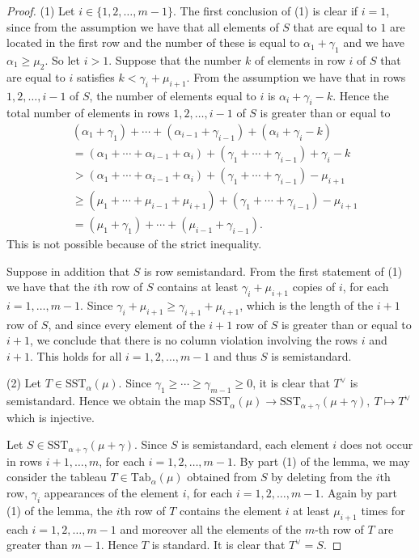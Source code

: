 \documentclass[ALCO,Unicode]{cedram}
\newcommand{\al}{\alpha}
\numberwithin{equation}{section}
\begin{document}
		\begin{proof}(1) Let $i \in \{1,2,\dots,m-1\}$. The first conclusion of (1) is clear if $i=1$, since from the assumption we have that all elements of $S$ that are equal to $1$ are located in the first row and the number of these is equal to $\al_1+\gamma_1 $ and we have  $\al_1 \ge \mu_2$. So let $i>1$. Suppose that the number $k$ of elements in row $i$ of  $S$ that are equal to $i$ satisfies $k<\gamma_i +\mu_{i+1}$. From the assumption we have that in rows $1,2,\dots,i-1$ of $S$, the number of elements equal to $i$ is $\al_i+\gamma_i-k$. Hence the total number of elements in rows $1,2,\dots, i-1$ of $S$ is greater than or equal to \begin{align*}
				&(\al_1 +\gamma_1) + \cdots + (\al_{i-1}+\gamma_{i-1})+(\al_i+\gamma_i-k) \\&=(\al_1+\cdots+\al_{i-1}+\al_i) +(\gamma_1+\cdots+\gamma_{i-1})+\gamma_i-k \\ &>(\al_1+\cdots+\al_{i-1}+\al_i) +(\gamma_1+\cdots+\gamma_{i-1})-\mu_{i+1} \\ &\ge (\mu_1+\cdots+\mu_{i-1}+\mu_{i+1})+(\gamma_1+\cdots+\gamma_{i-1})-\mu_{i+1}\\&=(\mu_1+\gamma_1)+\cdots+(\mu_{i-1}+\gamma_{i-1}).\end{align*} This is not possible because of the strict inequality.
			
			Suppose in addition that $S$ is row semistandard. From the first statement of (1) we have that the $i$th row of $S$ contains at least $\gamma_i + \mu_{i+1}$ copies of $i$, for each $i=1,\dots,m-1$. Since $\gamma_i + \mu_{i+1} \ge \gamma_{i+1}+\mu_{i+1}$, which is the length of the $i+1$ row of $S$, and since every element of the $i+1$ row of $S$ is greater than or equal to $i+1$, we conclude that there is no column violation involving the rows $i$ and $i+1$. This holds for all $i=1,2,\dots,m-1$ and thus $S$ is semistandard.
			
			(2) Let $T \in \mathrm{SST}_{\al}(\mu)$. Since $\gamma_1 \ge \cdots \ge \gamma_{m-1} \ge 0$, it is clear that $T^{\vee}$ is semistandard. Hence we obtain the map $\mathrm{SST}_{\al}(\mu) \to \mathrm{SST}_{\al+\gamma}(\mu+\gamma), \ T \mapsto T^{\vee}$ which is injective.
			
			Let  $S \in \mathrm{SST}_{\al+\gamma}(\mu+\gamma)$. Since $S$ is semistandard, each element $i$ does not occur in rows $i+1,\dots,m$, for each $i=1,2,\dots,m-1$. By part (1) of the lemma, we may consider the tableau $T \in \mathrm{Tab}_\al(\mu)$ obtained from $S$ by deleting from the $i$th row, $\gamma_i$ appearances of the element $i$, for each $i=1,2,\dots,m-1$. Again by part (1) of the lemma, the $i$th row of $T$ contains the element $i$ at least $\mu_{i+1}$ times for each $i=1,2,\dots,m-1$ and moreover all the elements of the $m$-th row of $T$ are greater than $m-1$. Hence $T$ is standard. It is clear that $T^{\vee}=S$.
		\end{proof}
		
\end{document}
